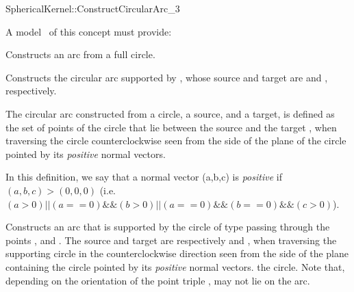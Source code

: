 \begin{ccRefFunctionObjectConcept}{SphericalKernel::ConstructCircularArc_3}

A model \ccVar\ of this concept must provide:

{Constructs an arc from a full circle.}

{Constructs the circular arc supported by , whose source and target 
are  and , respectively.
}

The circular arc constructed from a circle, a source, and a target, is
defined as the set of points of the circle that lie between the source 
and the target , when traversing the circle counterclockwise
seen from the side of the plane of the circle pointed by its \textit{positive} normal 
vectors.

In this definition, we say that a normal vector (a,b,c) is \textit{positive} if 
$(a,b,c)>(0,0,0)$ (i.e. $(a>0) || (a==0) \&\& (b>0) || (a==0)\&\&(b==0)\&\&(c>0)$).


{Constructs an arc that is supported by the circle of type
   passing through the points ,
   and . The source and target are respectively 
  and , when traversing the supporting circle in the
  counterclockwise direction   
  seen from the side of the plane containing the circle pointed by its \textit{positive}
  normal vectors.
  the circle. 
  Note that, depending on the orientation of the point triple
  ,  may not lie on the arc. 
}

\end{ccRefFunctionObjectConcept}

